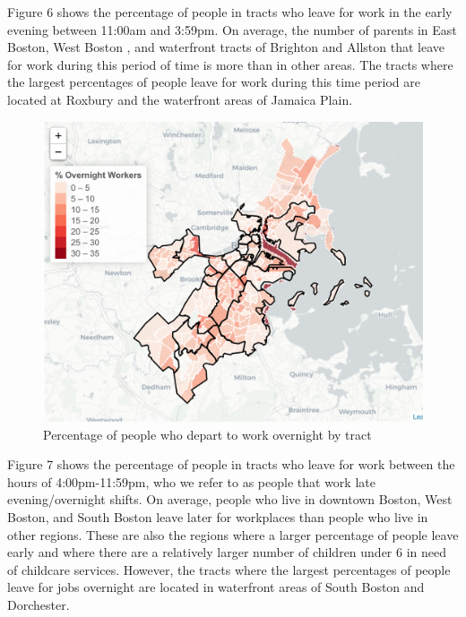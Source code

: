 \documentclass[10pt,letterpaper]{article}
\begin{document}
Figure 6 shows the percentage of people in tracts who leave for work in
the early evening between 11:00am and 3:59pm. On average, the number of
parents in East Boston, West Boston , and waterfront tracts of Brighton
and Allston that leave for work during this period of time is more than
in other areas. The tracts where the largest percentages of people leave
for work during this time period are located at Roxbury and the
waterfront areas of Jamaica Plain.

\begin{figure}

{\centering \includegraphics[width=0.8\linewidth]{fig6_percent_overnight} 

}

\caption{Percentage of people who depart to work overnight by tract}\label{fig:unnamed-chunk-13}
\end{figure}

Figure 7 shows the percentage of people in tracts who leave for work
between the hours of 4:00pm-11:59pm, who we refer to as people that work
late evening/overnight shifts. On average, people who live in downtown
Boston, West Boston, and South Boston leave later for workplaces than
people who live in other regions. These are also the regions where a
larger percentage of people leave early and where there are a relatively
larger number of children under 6 in need of childcare services.
However, the tracts where the largest percentages of people leave for
jobs overnight are located in waterfront areas of South Boston and
Dorchester.
\end{document}
